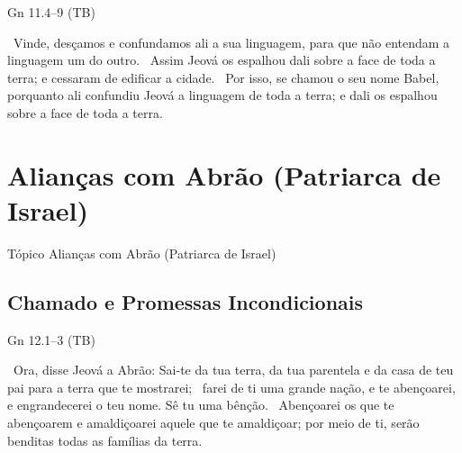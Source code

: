 \documentclass[12pt,aspectratio=169]{beamer}
\newcommand{\ver}[1]{%
    \raisebox{0.50ex}{%
        \scalebox{1.1}{%
            \pmb{\textbf{\textcolor{BSpbg}{#1}}}%
        }%
    }%
}
\newcommand{\QUOTE}[1]{%
    \par\noindent\hspace*{0.05\linewidth}%
    \begin{minipage}{0.9\linewidth}%
        \linespread{1.35}\large{#1}%
    \end{minipage}%
}
\newcommand{\RED}[1]{{\textcolor{TXred}{#1}}}
\newcommand{\YEL}[1]{{\textcolor{TXyel}{#1}}}
\newcommand{\GRE}[1]{{\textcolor{TXgre}{#1}}}
\newcommand{\CYA}[1]{{\textcolor{TXcya}{#1}}}
\newcommand{\BLU}[1]{{\textcolor{TXblu}{#1}}}
\newcommand{\MAG}[1]{{\textcolor{TXmag}{#1}}}
\newcommand{\BRI}[1]{{\textcolor{BSpbg}{#1}}}   %
\begin{document}
    \begin{frame}{Gn 11.4--9 (TB)}
        \QUOTE{%
            \ver{7}~Vinde, desçamos e confundamos ali a sua linguagem, para que não entendam a
            linguagem um do outro.
            \ver{8}~Assim Jeová os \YEL{espalhou dali} sobre a face de toda a terra; e cessaram
            de edificar a cidade.
            \ver{9}~Por isso, se chamou o seu nome \YEL{Babel}, porquanto ali \YEL{confundiu}
            Jeová a linguagem de toda a terra; e dali os \YEL{espalhou} sobre a face de toda a
            terra.
        }
    \end{frame}

\section{Alianças com Abrão (Patriarca de Israel)}

    \begin{frame}
        \par\noindent\hspace*{0.05\linewidth}%
        \begin{minipage}{0.9\linewidth}%
            \linespread{1.35}\large%
            \begin{alertblock}{Tópico}
                Alianças com Abrão (Patriarca de Israel)
            \end{alertblock}
        \end{minipage}%
    \end{frame}

    \subsection{Chamado e Promessas \BRI{Incondicionais}}

    \begin{frame}{Gn 12.1--3 (TB)}
        \QUOTE{%
            \ver{1}~Ora, disse Jeová a Abrão: Sai-te da tua terra, da tua parentela e da casa de
            teu pai para a terra que te mostrarei;
            \ver{2}~farei de ti uma \YEL{grande nação}, e te \GRE{abençoarei}, e
            \CYA{engrandecerei} o teu nome.  \GRE{Sê tu uma bênção}.
            \ver{3}~\BLU{Abençoarei os que te abençoarem} e \RED{amaldiçoarei aquele que te
            amaldiçoar}; por meio de ti, serão \MAG{benditas todas as famílias da terra}.
        }
    \end{frame}
\end{document}
